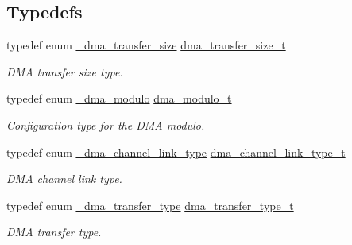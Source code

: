 \subsection*{Typedefs}
\begin{DoxyCompactItemize}
\item 
\mbox{\label{group__dma_ga77280b3fae0e8ee447666e14c101dfe0}} 
typedef enum \mbox{\hyperlink{group__dma_ga0b291003d51dd119595ed7aa7462a693}{\+\_\+dma\+\_\+transfer\+\_\+size}} \mbox{\hyperlink{group__dma_ga77280b3fae0e8ee447666e14c101dfe0}{dma\+\_\+transfer\+\_\+size\+\_\+t}}
\begin{DoxyCompactList}\small\item\em D\+MA transfer size type. \end{DoxyCompactList}\item 
\mbox{\label{group__dma_gabebfc9ea7534e8f71a7ee1b5c13bf2f5}} 
typedef enum \mbox{\hyperlink{group__dma_gac84ba3b7ce788dc06afbda949e9a039b}{\+\_\+dma\+\_\+modulo}} \mbox{\hyperlink{group__dma_gabebfc9ea7534e8f71a7ee1b5c13bf2f5}{dma\+\_\+modulo\+\_\+t}}
\begin{DoxyCompactList}\small\item\em Configuration type for the D\+MA modulo. \end{DoxyCompactList}\item 
\mbox{\label{group__dma_ga3ee1ff3a58659ae3e61603b672b0a2fb}} 
typedef enum \mbox{\hyperlink{group__dma_ga741c3a62f7938bf691a12d6304f0247c}{\+\_\+dma\+\_\+channel\+\_\+link\+\_\+type}} \mbox{\hyperlink{group__dma_ga3ee1ff3a58659ae3e61603b672b0a2fb}{dma\+\_\+channel\+\_\+link\+\_\+type\+\_\+t}}
\begin{DoxyCompactList}\small\item\em D\+MA channel link type. \end{DoxyCompactList}\item 
\mbox{\label{group__dma_ga834a242c5bc2fc0fb4cf928616821de0}} 
typedef enum \mbox{\hyperlink{group__dma_ga8eb175ece33c966ea83656c6b38e95cb}{\+\_\+dma\+\_\+transfer\+\_\+type}} \mbox{\hyperlink{group__dma_ga834a242c5bc2fc0fb4cf928616821de0}{dma\+\_\+transfer\+\_\+type\+\_\+t}}
\begin{DoxyCompactList}\small\item\em D\+MA transfer type. \end{DoxyCompactList}\item 

\end{DoxyCompactItemize}
